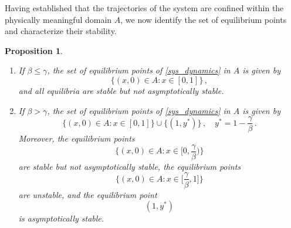 \documentclass{article}
\newtheorem{definition}{Definition}[section]
\newtheorem{proposition}[theorem]{Proposition}
\begin{document}
Having established that the trajectories of the system are confined within the physically meaningful domain $A$, we now identify the set of equilibrium points and characterize their stability.


\begin{proposition}\label{prop:equilibria}
\begin{enumerate}
\item[(i)] If $\beta \le \gamma$, the set of equilibrium points of \eqref{sys_dynamics} in $A$ is given by
\begin{equation}\label{eq:stable_below}
\{(x,0) \in A: x \in [0,1]\}\,,
\end{equation}
and all equilibria are stable but not asymptotically stable. 
\item[(ii)] If $\beta > \gamma$, the set of equilibrium points of \eqref{sys_dynamics} in $A$ is given by 
$$\{(x,0) \in A: x \in [0,1]\} \cup \{(1,y^*)\}\,, \quad y^* = 1-\frac{\gamma}{\beta}\,.$$
Moreover, the equilibrium points 
\begin{equation}\label{eq:stable}\Big\{(x,0) \in A: x \in \Big[0,\frac\gamma\beta\Big)\Big\}\end{equation}
are stable but not asymptotically stable, the equilibrium points
\begin{equation}\label{eq:unstable}\Big\{(x,0) \in A: x \in \Big[\frac\gamma\beta,1\Big]\Big\}\end{equation}
are unstable, and the equilibrium point
\begin{equation}\label{eq:as_stable}
(1,y^*)
\end{equation}
is asymptotically stable.
\end{enumerate}
\end{proposition}
\end{document}
